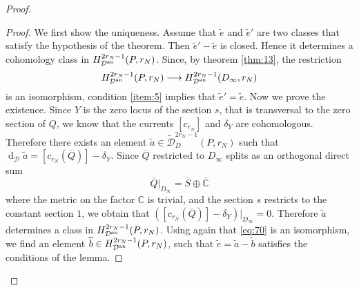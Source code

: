 \documentclass[10pt,twoside]{article}
\numberwithin{equation}{section}
\theoremstyle{plain}
\theoremstyle{definition}
\DeclareMathOperator{\dd}{d}
\newcommand{\an}{\text{{\rm an}}}
\begin{document}
\begin{proof}
  \begin{proof}
    We first show the uniqueness. Assume that $\widetilde e$ and
    $\widetilde e'$ are two classes that satisfy the hypothesis of the
    theorem. Then $\widetilde e'-\widetilde e$ is closed. Hence it
    determines a cohomology class in
    $H^{2r_{N}-1}_{\mathcal{D}^{\an}}(P,r_{N})$. Since, by theorem
    \ref{thm:13}, the restriction
    \begin{equation}
      \label{eq:70}
      H^{2r_{N}-1}_{\mathcal{D}^{\an}}(P,r_{N})\longrightarrow
    H^{2r_{N}-1}_{\mathcal{D}^{\an}}(D_{\infty},r_{N})
    \end{equation}
    is an
    isomorphism, condition \ref{item:5} implies that $\widetilde
    e'=\widetilde e$. Now we prove the existence. Since $Y$ is the
    zero locus of the section $s$, that is transversal to the zero
    section of $Q$, we know that the currents $[c_{r_{N}}]$ and
    $\delta _{Y}$ are cohomologous. Therefore there exists an element
    $\widetilde a\in \widetilde {\mathcal{D}}^{2r_{N}-1}_{D}(P,r_{N})$
    such that $\dd_{\mathcal{D}}\widetilde a
    =[c_{r_{N}}(\overline Q)]-\delta _{Y}$.
    Since $\overline Q$ restricted to
    $D_{\infty}$ splits as an orthogonal direct sum
    \begin{equation}
      \label{eq:35}
      \overline
    Q|_{D_{\infty}}=\overline S\oplus \overline {\mathbb{C}}
    \end{equation}
    where
    the metric on the factor $\mathbb{C}$ is trivial, and
    the section $s$ restricts to the constant section $1$, we obtain
    that $([c_{r_{N}}(\overline Q)]-\delta
    _{Y})|_{D_{\infty}}=0$. Therefore $\widetilde a$ determines a
    class in  $H^{2r_{N}-1}_{\mathcal{D}^{\an}}(P,r_{N})$.  Using again that
  \eqref{eq:70} is an isomorphism, we find an element $\widetilde b\in
  H^{2r_{N}-1}_{\mathcal{D}^{\an}}(P,r_{N})$, such that $\widetilde
  e=\widetilde a-\widetilde b$  satisfies the conditions of the lemma.
  \end{proof}


\end{proof}
\end{document}
